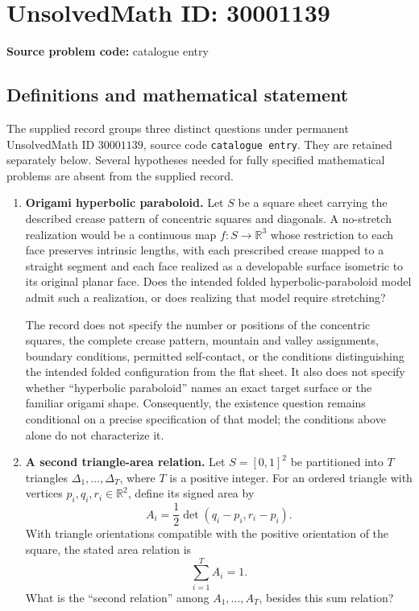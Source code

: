 \documentclass[11pt]{article}
\newcommand{\R}{\mathbb{R}}
\begin{document}
\section*{UnsolvedMath ID: 30001139}
\textbf{Source problem code:} catalogue entry
\subsection{Definitions and mathematical statement}
The supplied record groups three distinct questions under permanent UnsolvedMath ID \(30001139\), source code \texttt{catalogue entry}. They are retained separately below. Several hypotheses needed for fully specified mathematical problems are absent from the supplied record.

\begin{enumerate}
\item \textbf{Origami hyperbolic paraboloid.} Let \(S\) be a square sheet carrying the described crease pattern of concentric squares and diagonals. A no-stretch realization would be a continuous map \(f:S\to\R^3\) whose restriction to each face preserves intrinsic lengths, with each prescribed crease mapped to a straight segment and each face realized as a developable surface isometric to its original planar face. Does the intended folded hyperbolic-paraboloid model admit such a realization, or does realizing that model require stretching?

The record does not specify the number or positions of the concentric squares, the complete crease pattern, mountain and valley assignments, boundary conditions, permitted self-contact, or the conditions distinguishing the intended folded configuration from the flat sheet. It also does not specify whether ``hyperbolic paraboloid'' names an exact target surface or the familiar origami shape. Consequently, the existence question remains conditional on a precise specification of that model; the conditions above alone do not characterize it.

\item \textbf{A second triangle-area relation.} Let \(S=[0,1]^2\) be partitioned into \(T\) triangles \(\Delta_1,\ldots,\Delta_T\), where \(T\) is a positive integer. For an ordered triangle with vertices \(p_i,q_i,r_i\in\R^2\), define its signed area by
\[
 A_i=\frac12\det(q_i-p_i,r_i-p_i).
\]
With triangle orientations compatible with the positive orientation of the square, the stated area relation is
\[
 \sum_{i=1}^{T}A_i=1.
\]
What is the ``second relation'' among \(A_1,\ldots,A_T\), besides this sum relation?


\end{enumerate}
\end{document}
